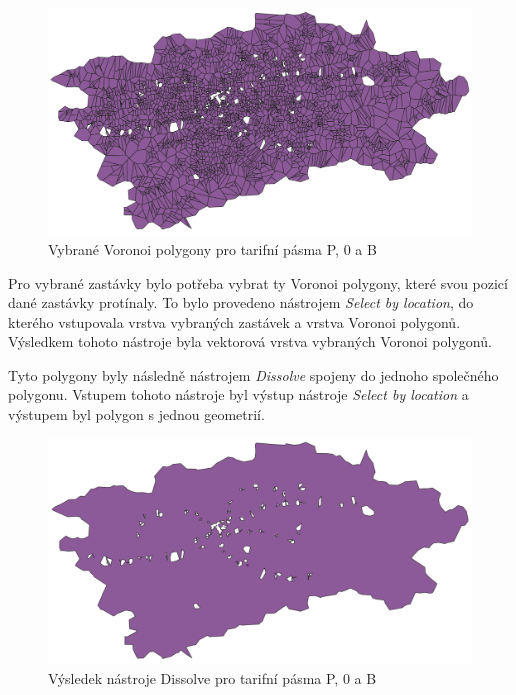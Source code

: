 \begin{figure}[H] \centering
    \includegraphics[width=400pt]{./pictures/voronoi-selected-P0B.png}
    \caption[Vybrané Voronoi polygony pro tarifní pásma P, 0 a B]{Vybrané Voronoi polygony pro tarifní pásma P, 0 a B}
	\label{fig:voronoi-selected}              
\end{figure}

Pro vybrané zastávky bylo potřeba vybrat ty Voronoi polygony, které svou
pozicí dané zastávky protínaly. To bylo provedeno nástrojem \textit{Select by location},
do kterého vstupovala vrstva vybraných zastávek a vrstva Voronoi polygonů. Výsledkem tohoto nástroje byla
vektorová vrstva vybraných Voronoi polygonů.

Tyto polygony byly následně nástrojem \textit{Dissolve} spojeny do jednoho společného polygonu.
Vstupem tohoto nástroje byl výstup nástroje \textit{Select by location} a výstupem byl polygon
s jednou geometrií. 

\begin{figure}[H] \centering
    \includegraphics[width=400pt]{./pictures/dissolve-P0B.png}
    \caption[Výsledek nástroje Dissolve pro tarifní pásma P, 0 a B]{Výsledek nástroje Dissolve pro tarifní pásma P, 0 a B}
	\label{fig:dissolve}              
\end{figure} 

